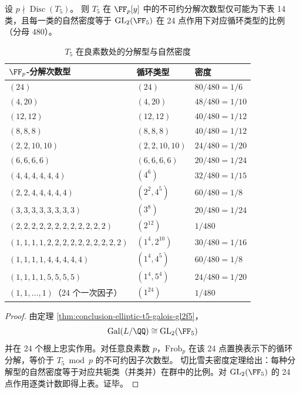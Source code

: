 \begin{theorem}[\(T_5\) 的完整分解型与切比雪夫密度表]\label{thm:conclusion-elliptic-t5-full-chebotarev-splitting-table}
设 \(p\nmid \operatorname{Disc}(T_5)\)。
则 \(T_5\) 在 \(\FF_p[y]\) 中的不可约分解次数型仅可能为下表 14 类，且每一类的自然密度等于
\(\mathrm{GL}_2(\FF_5)\) 在 24 点作用下对应循环类型的比例（分母 \(480\)）。

\begin{table}[H]
\centering
\small
\caption{\(T_5\) 在良素数处的分解型与自然密度}
\label{tab:conclusion-elliptic-t5-factorization-density}
\begin{tabular}{lll}
\toprule
\(\FF_p\)-分解次数型 & 循环类型 & 密度 \\
\midrule
\((24)\) & \((24)\) & \(80/480=1/6\) \\
\((4,20)\) & \((4,20)\) & \(48/480=1/10\) \\
\((12,12)\) & \((12,12)\) & \(40/480=1/12\) \\
\((8,8,8)\) & \((8,8,8)\) & \(40/480=1/12\) \\
\((2,2,10,10)\) & \((2,2,10,10)\) & \(24/480=1/20\) \\
\((6,6,6,6)\) & \((6,6,6,6)\) & \(20/480=1/24\) \\
\((4,4,4,4,4,4)\) & \((4^6)\) & \(32/480=1/15\) \\
\((2,2,4,4,4,4,4)\) & \((2^2,4^5)\) & \(60/480=1/8\) \\
\((3,3,3,3,3,3,3,3)\) & \((3^8)\) & \(20/480=1/24\) \\
\((2,2,2,2,2,2,2,2,2,2,2,2)\) & \((2^{12})\) & \(1/480\) \\
\((1,1,1,1,2,2,2,2,2,2,2,2,2,2)\) & \((1^4,2^{10})\) & \(30/480=1/16\) \\
\((1,1,1,1,4,4,4,4,4)\) & \((1^4,4^5)\) & \(60/480=1/8\) \\
\((1,1,1,1,5,5,5,5)\) & \((1^4,5^4)\) & \(24/480=1/20\) \\
\((1,1,\dots,1)\)（24 个一次因子） & \((1^{24})\) & \(1/480\) \\
\bottomrule
\end{tabular}
\end{table}
\end{theorem}
\begin{proof}
由定理 \ref{thm:conclusion-elliptic-t5-galois-gl2f5}，
\[
\mathrm{Gal}(L/\QQ)\cong \mathrm{GL}_2(\FF_5)
\]
并在 24 个根上忠实作用。对任意良素数 \(p\)，\(\mathrm{Frob}_p\) 在该 24 点置换表示下的循环分解，等价于 \(T_5\bmod p\) 的不可约因子次数型。
切比雪夫密度定理给出：每种分解型的自然密度等于对应共轭类（并类并）在群中的比例。对 \(\mathrm{GL}_2(\FF_5)\) 的 24 点作用逐类计数即得上表。证毕。
\end{proof}

